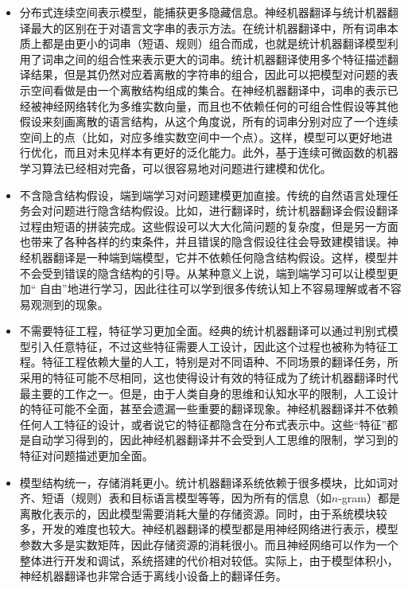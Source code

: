 \begin{itemize}
\vspace{0.5em}
\item 分布式连续空间表示模型，能捕获更多隐藏信息。神经机器翻译与统计机器翻译最大的区别在于对语言文字串的表示方法。在统计机器翻译中，所有词串本质上都是由更小的词串（短语、规则）组合而成，也就是统计机器翻译模型利用了词串之间的组合性来表示更大的词串。统计机器翻译使用多个特征描述翻译结果，但是其仍然对应着离散的字符串的组合，因此可以把模型对问题的表示空间看做是由一个离散结构组成的集合。在神经机器翻译中，词串的表示已经被神经网络转化为多维实数向量，而且也不依赖任何的可组合性假设等其他假设来刻画离散的语言结构，从这个角度说，所有的词串分别对应了一个连续空间上的点（比如，对应多维实数空间中一个点）。这样，模型可以更好地进行优化，而且对未见样本有更好的泛化能力。此外，基于连续可微函数的机器学习算法已经相对完备，可以很容易地对问题进行建模和优化。

\vspace{0.5em}
\item 不含隐含结构假设，端到端学习对问题建模更加直接。传统的自然语言处理任务会对问题进行隐含结构假设。比如，进行翻译时，统计机器翻译会假设翻译过程由短语的拼装完成。这些假设可以大大化简问题的复杂度，但是另一方面也带来了各种各样的约束条件，并且错误的隐含假设往往会导致建模错误。神经机器翻译是一种端到端模型，它并不依赖任何隐含结构假设。这样，模型并不会受到错误的隐含结构的引导。从某种意义上说，端到端学习可以让模型更加“ 自由”地进行学习，因此往往可以学到很多传统认知上不容易理解或者不容易观测到的现象。

\vspace{0.5em}
\item 不需要特征工程，特征学习更加全面。经典的统计机器翻译可以通过判别式模型引入任意特征，不过这些特征需要人工设计，因此这个过程也被称为特征工程。特征工程依赖大量的人工，特别是对不同语种、不同场景的翻译任务，所采用的特征可能不尽相同，这也使得设计有效的特征成为了统计机器翻译时代最主要的工作之一。但是，由于人类自身的思维和认知水平的限制，人工设计的特征可能不全面，甚至会遗漏一些重要的翻译现象。神经机器翻译并不依赖任何人工特征的设计，或者说它的特征都隐含在分布式表示中。这些“特征”都是自动学习得到的，因此神经机器翻译并不会受到人工思维的限制，学习到的特征对问题描述更加全面。

\vspace{0.5em}
\item 模型结构统一，存储消耗更小。统计机器翻译系统依赖于很多模块，比如词对齐、短语（规则）表和目标语言模型等等，因为所有的信息（如$n$-gram）都是离散化表示的，因此模型需要消耗大量的存储资源。同时，由于系统模块较多，开发的难度也较大。神经机器翻译的模型都是用神经网络进行表示，模型参数大多是实数矩阵，因此存储资源的消耗很小。而且神经网络可以作为一个整体进行开发和调试，系统搭建的代价相对较低。实际上，由于模型体积小，神经机器翻译也非常合适于离线小设备上的翻译任务。

\vspace{0.5em}
\end{itemize}

